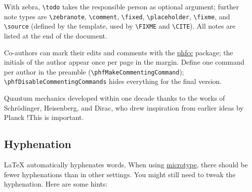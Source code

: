 With zebra, \verb|\todo| takes the responsible person as optional argument; further note types are \verb|\zebranote|, \verb|\comment|, \verb|\fixed|, \verb|\placeholder|, \verb|\fixme|, and \verb|\source| (defined by the template, used by \verb|\FIXME| and \verb|\CITE|).
All notes are listed at the end of the document.

\begin{ltgexample}




\end{ltgexample}


Co-authors can mark their edits and comments with the \href{https://ctan.org/pkg/phfcc}{phfcc} package; the initials of the author appear once per page in the margin.
Define one command per author in the preamble (\verb|\phfMakeCommentingCommand|); \verb|\phfDisableCommentingCommands| hides everything for the final version.

\begin{ltgexample}
Quantum mechanics developed within one decade thanks to the works of Schrödinger, Heisenberg, and Dirac,
who drew inspiration from earlier ideas by Planck  
 \FA!{This is important.}
\end{ltgexample}

\subsection{Hyphenation}

\LaTeX{} automatically hyphenates words.
When using \href{https://ctan.org/pkg/microtype}{microtype}, there should be fewer hyphenations than in other settings.
You might still need to tweak the hyphenation.
Here are some hints:


